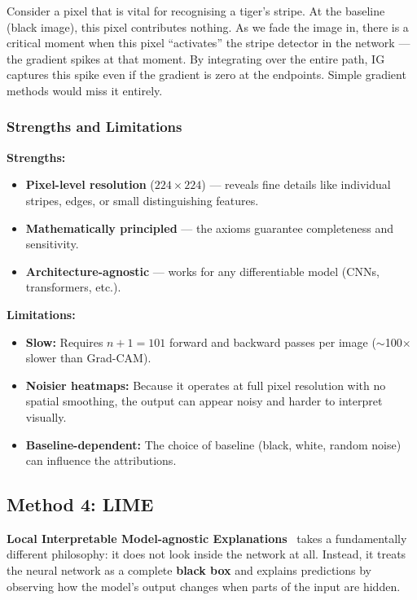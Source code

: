 \documentclass[12pt, a4paper]{article}
\begin{document}
Consider a pixel that is vital for recognising a tiger's stripe.  At the
baseline (black image), this pixel contributes nothing.  As we fade the image
in, there is a critical moment when this pixel ``activates'' the stripe
detector in the network --- the gradient spikes at that moment.  By integrating
over the entire path, IG captures this spike even if the gradient is zero at
the endpoints.  Simple gradient methods would miss it entirely.

\subsubsection{Strengths and Limitations}

\textbf{Strengths:}
\begin{itemize}[leftmargin=*]
    \item \textbf{Pixel-level resolution} ($224 \times 224$) --- reveals fine
          details like individual stripes, edges, or small distinguishing
          features.
    \item \textbf{Mathematically principled} --- the axioms guarantee
          completeness and sensitivity.
    \item \textbf{Architecture-agnostic} --- works for any differentiable
          model (CNNs, transformers, etc.).
\end{itemize}

\textbf{Limitations:}
\begin{itemize}[leftmargin=*]
    \item \textbf{Slow:} Requires $n + 1 = 101$ forward and backward passes
          per image ($\sim$100$\times$ slower than Grad-CAM).
    \item \textbf{Noisier heatmaps:} Because it operates at full pixel
          resolution with no spatial smoothing, the output can appear noisy
          and harder to interpret visually.
    \item \textbf{Baseline-dependent:} The choice of baseline (black, white,
          random noise) can influence the attributions.
\end{itemize}


\subsection{Method 4: LIME}

\textbf{Local Interpretable Model-agnostic Explanations}~\cite{ribeiro2016lime}
takes a fundamentally different philosophy: it does not look inside the network
at all.  Instead, it treats the neural network as a complete \textbf{black box}
and explains predictions by observing how the model's output changes when parts
of the input are hidden.
\end{document}
